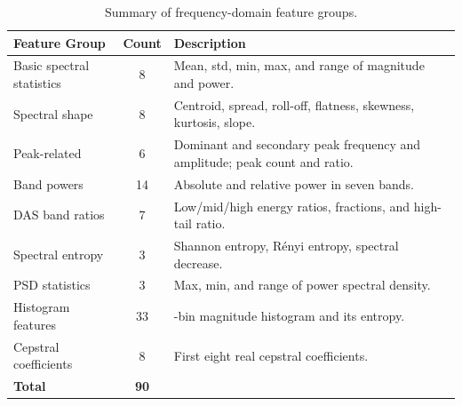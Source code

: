\begin{table}[!htbp]
	\centering
	\caption{Summary of frequency-domain feature groups.}
	\label{tab:freqfeatures}
	\small
	\begin{tabularx}{\textwidth}{@{}>{\raggedright\arraybackslash}p{3.4cm} c >{\raggedright\arraybackslash}X@{}}
		\toprule
		\textbf{Feature Group} & \textbf{Count} & \textbf{Description}\\
		\midrule
		Basic spectral statistics & 8  & Mean, std, min, max, and range of magnitude and power.\\
		Spectral shape            & 8  & Centroid, spread, roll-off, flatness, skewness, kurtosis, slope.\\
		Peak-related              & 6  & Dominant and secondary peak frequency and amplitude; peak count and ratio.\\
		Band powers               & 14 & Absolute and relative power in seven bands.\\
		DAS band ratios           & 7  & Low/mid/high energy ratios, fractions, and high-tail ratio.\\
		Spectral entropy          & 3  & Shannon entropy, R\'enyi entropy, spectral decrease.\\
		PSD statistics            & 3  & Max, min, and range of power spectral density.\\
		Histogram features        & 33 & 32-bin magnitude histogram and its entropy.\\
		Cepstral coefficients     & 8  & First eight real cepstral coefficients.\\
		\midrule
		\textbf{Total}            & \textbf{90} & \\
		\bottomrule
	\end{tabularx}
\end{table}

